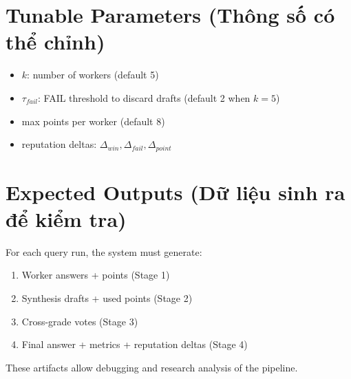 \documentclass[11pt]{article}
\begin{document}
\section{Tunable Parameters (Thông số có thể chỉnh)}
\begin{itemize}[leftmargin=1.2em]
  \item \(k\): number of workers (default 5)
  \item \(\tau_{fail}\): FAIL threshold to discard drafts (default 2 when \(k=5\))
  \item max points per worker (default 8)
  \item reputation deltas: \(\Delta_{win}, \Delta_{fail}, \Delta_{point}\)
\end{itemize}

\section{Expected Outputs (Dữ liệu sinh ra để kiểm tra)}
For each query run, the system must generate:
\begin{enumerate}[leftmargin=1.2em]
  \item Worker answers + points (Stage 1)
  \item Synthesis drafts + used points (Stage 2)
  \item Cross-grade votes (Stage 3)
  \item Final answer + metrics + reputation deltas (Stage 4)
\end{enumerate}
These artifacts allow debugging and research analysis of the pipeline.
\end{document}
